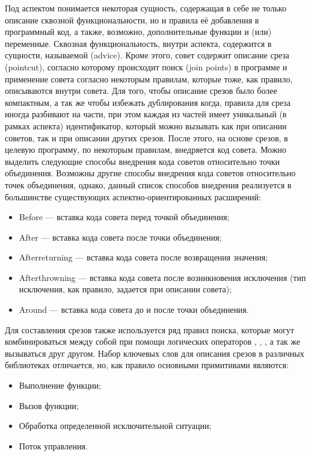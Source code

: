 Под аспектом понимается некоторая сущность, содержащая в себе не только описание
сквозной функциональности, но и правила её добавления в программный код, а
также, возможно, дополнительные функции и (или) переменные.
Сквозная функциональность, внутри аспекта, содержится в сущности, называемой
 (advice).
Кроме этого, совет содержит описание среза (pointcut), согласно которому
происходит поиск  (join points) в программе и применение
совета согласно некоторым правилам, которые тоже, как правило, описываются
внутри совета.
Для того, чтобы описание срезов было более компактным, а так же чтобы избежать
дублирования когда, правила для среза иногда разбивают на части, при этом каждая
из частей имеет уникальный (в рамках аспекта) идентификатор, который можно
вызывать как при описании советов, так и при описании других срезов.
После этого, на основе срезов, в целевую программу, по некоторым правилам,
внедряется код совета.
Можно выделить следующие способы внедрения кода советов относительно точки
объединения.
Возможны другие способы внедрения кода советов относительно точек объединения, однако, данный список способов внедрения реализуется в большинстве существующих аспектно-ориентированных расширений:
\begin{itemize}
  \item Before --- вставка кода совета перед точкой объединения;
  \item After --- вставка кода совета после точки объединения;
  \item Afterreturning --- вставка кода совета после возвращения значения;
  \item Afterthrowning --- вставка кода совета после возникновения исключения
    (тип исключения, как правило, задается при описании совета);
  \item Around --- вставка кода совета до и после точки объединения.
\end{itemize}

Для составления срезов также используется ряд правил поиска, которые могут
комбинироваться между собой при помощи логических операторов ,
, , а так же вызываться друг другом.
Набор ключевых слов для описания срезов в различных библиотеках отличается, но,
как правило основными примитивами являются:
\begin{itemize}
  \item Выполнение функции;
  \item Вызов функции;
  \item Обработка определенной исключительной ситуации;
  \item Поток управления.
\end{itemize}
